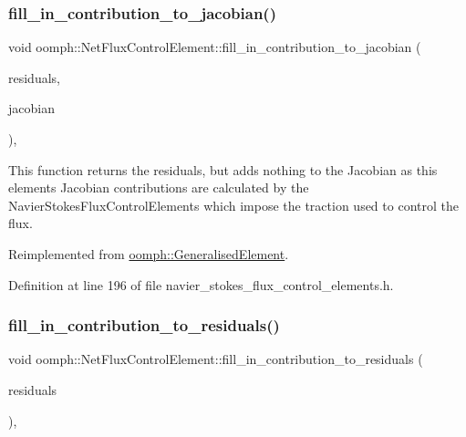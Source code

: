 \subsubsection{\texorpdfstring{fill\+\_\+in\+\_\+contribution\+\_\+to\+\_\+jacobian()}{fill\_in\_contribution\_to\_jacobian()}}
{\footnotesize\ttfamily void oomph\+::\+Net\+Flux\+Control\+Element\+::fill\+\_\+in\+\_\+contribution\+\_\+to\+\_\+jacobian (\begin{DoxyParamCaption}\item[{\hyperlink{classoomph_1_1Vector}{Vector}$<$ double $>$ \&}]{residuals,  }\item[{\hyperlink{classoomph_1_1DenseMatrix}{Dense\+Matrix}$<$ double $>$ \&}]{jacobian }\end{DoxyParamCaption})\hspace{0.3cm}{\ttfamily [inline]}, {\ttfamily [virtual]}}



This function returns the residuals, but adds nothing to the Jacobian as this element\textquotesingle{}s Jacobian contributions are calculated by the Navier\+Stokes\+Flux\+Control\+Elements which impose the traction used to control the flux. 



Reimplemented from \hyperlink{classoomph_1_1GeneralisedElement_a6ae09fc0d68e4309ac1b03583d252845}{oomph\+::\+Generalised\+Element}.



Definition at line 196 of file navier\+\_\+stokes\+\_\+flux\+\_\+control\+\_\+elements.\+h.

\mbox{\label{classoomph_1_1NetFluxControlElement_a1042b589f6b086f5485214057f255678}} 
\subsubsection{\texorpdfstring{fill\+\_\+in\+\_\+contribution\+\_\+to\+\_\+residuals()}{fill\_in\_contribution\_to\_residuals()}}
{\footnotesize\ttfamily void oomph\+::\+Net\+Flux\+Control\+Element\+::fill\+\_\+in\+\_\+contribution\+\_\+to\+\_\+residuals (\begin{DoxyParamCaption}\item[{\hyperlink{classoomph_1_1Vector}{Vector}$<$ double $>$ \&}]{residuals }\end{DoxyParamCaption})\hspace{0.3cm}{\ttfamily [inline]}, {\ttfamily [virtual]}}




